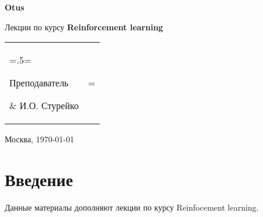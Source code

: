\documentclass[a4paper, 14pt]{extreport}
\begin{document}
\begin{titlepage}                                                         
	\newpage                                                                        
	\begin{center}                                                        
		\textbf{Otus}                                                                                                                                            
	\end{center}                                                          
	
	\vspace{14em}                                                        
	
	\begin{center}                                                                                      
		\Large Лекции \linebreak                                  
		по курсу  \linebreak 
		\textbf{Reinforcement learning}
	\end{center}                                                          
	                                                
	                                                        
	\vspace{6em}                                                                    


	\begin{tabularx}{0.9\textwidth}{>{\hsize=.5\hsize\linewidth=\hsize}X
			>{\hsize=2.5\hsize\linewidth=\hsize}r}
			\noindent\parbox[b]{\hsize}{Преподаватель} & \makebox[3cm]{\hrulefill} И.О. Стурейко\\
	\end{tabularx}       
                                  

	\vspace{\fill}                                                    
	
	\begin{center}                                                        
		Москва, \today                                                                
	\end{center}                                                          
	
\end{titlepage}

\setcounter{page}{2} %

\chapter*{Введение}
\begin{onehalfspace}

Данные материалы дополняют лекции по курсу Reinfocement learning.
\end{onehalfspace}

\tableofcontents



\end{document}
